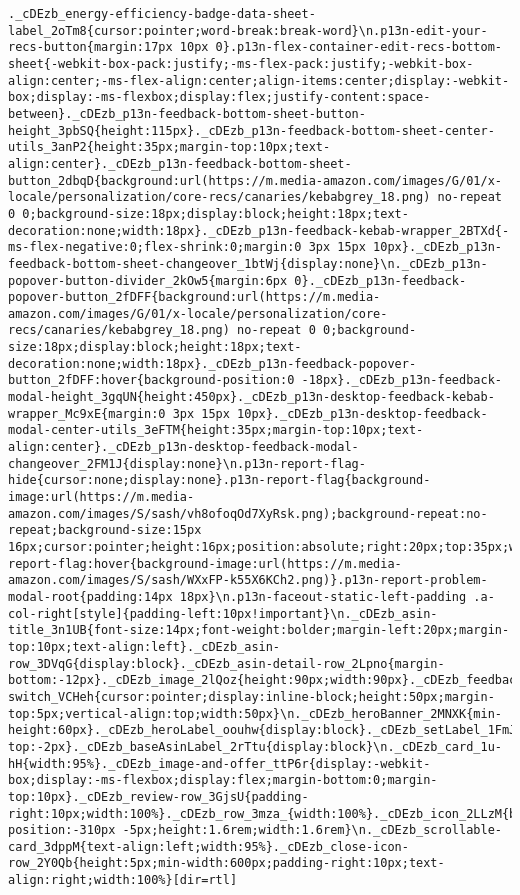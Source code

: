 \documentclass[
]{article}
\begin{document}
\begin{verbatim}
._cDEzb_energy-efficiency-badge-data-sheet-label_2oTm8{cursor:pointer;word-break:break-word}\n.p13n-edit-your-recs-button{margin:17px 10px 0}.p13n-flex-container-edit-recs-bottom-sheet{-webkit-box-pack:justify;-ms-flex-pack:justify;-webkit-box-align:center;-ms-flex-align:center;align-items:center;display:-webkit-box;display:-ms-flexbox;display:flex;justify-content:space-between}._cDEzb_p13n-feedback-bottom-sheet-button-height_3pbSQ{height:115px}._cDEzb_p13n-feedback-bottom-sheet-center-utils_3anP2{height:35px;margin-top:10px;text-align:center}._cDEzb_p13n-feedback-bottom-sheet-button_2dbqD{background:url(https://m.media-amazon.com/images/G/01/x-locale/personalization/core-recs/canaries/kebabgrey_18.png) no-repeat 0 0;background-size:18px;display:block;height:18px;text-decoration:none;width:18px}._cDEzb_p13n-feedback-kebab-wrapper_2BTXd{-ms-flex-negative:0;flex-shrink:0;margin:0 3px 15px 10px}._cDEzb_p13n-feedback-bottom-sheet-changeover_1btWj{display:none}\n._cDEzb_p13n-popover-button-divider_2kOw5{margin:6px 0}._cDEzb_p13n-feedback-popover-button_2fDFF{background:url(https://m.media-amazon.com/images/G/01/x-locale/personalization/core-recs/canaries/kebabgrey_18.png) no-repeat 0 0;background-size:18px;display:block;height:18px;text-decoration:none;width:18px}._cDEzb_p13n-feedback-popover-button_2fDFF:hover{background-position:0 -18px}._cDEzb_p13n-feedback-modal-height_3gqUN{height:450px}._cDEzb_p13n-desktop-feedback-kebab-wrapper_Mc9xE{margin:0 3px 15px 10px}._cDEzb_p13n-desktop-feedback-modal-center-utils_3eFTM{height:35px;margin-top:10px;text-align:center}._cDEzb_p13n-desktop-feedback-modal-changeover_2FM1J{display:none}\n.p13n-report-flag-hide{cursor:none;display:none}.p13n-report-flag{background-image:url(https://m.media-amazon.com/images/S/sash/vh8ofoqOd7XyRsk.png);background-repeat:no-repeat;background-size:15px 16px;cursor:pointer;height:16px;position:absolute;right:20px;top:35px;width:15px}.p13n-report-flag:hover{background-image:url(https://m.media-amazon.com/images/S/sash/WXxFP-k55X6KCh2.png)}.p13n-report-problem-modal-root{padding:14px 18px}\n.p13n-faceout-static-left-padding .a-col-right[style]{padding-left:10px!important}\n._cDEzb_asin-title_3n1UB{font-size:14px;font-weight:bolder;margin-left:20px;margin-top:10px;text-align:left}._cDEzb_asin-row_3DVqG{display:block}._cDEzb_asin-detail-row_2Lpno{margin-bottom:-12px}._cDEzb_image_2lQoz{height:90px;width:90px}._cDEzb_feedback-switch_VCHeh{cursor:pointer;display:inline-block;height:50px;margin-top:5px;vertical-align:top;width:50px}\n._cDEzb_heroBanner_2MNXK{min-height:60px}._cDEzb_heroLabel_oouhw{display:block}._cDEzb_setLabel_1FmJN{display:block;margin-top:-2px}._cDEzb_baseAsinLabel_2rTtu{display:block}\n._cDEzb_card_1u-hH{width:95%}._cDEzb_image-and-offer_ttP6r{display:-webkit-box;display:-ms-flexbox;display:flex;margin-bottom:0;margin-top:10px}._cDEzb_review-row_3GjsU{padding-right:10px;width:100%}._cDEzb_row_3mza_{width:100%}._cDEzb_icon_2LLzM{background-position:-310px -5px;height:1.6rem;width:1.6rem}\n._cDEzb_scrollable-card_3dppM{text-align:left;width:95%}._cDEzb_close-icon-row_2Y0Qb{height:5px;min-width:600px;padding-right:10px;text-align:right;width:100%}[dir=rtl] 
\end{verbatim}
\end{document}
